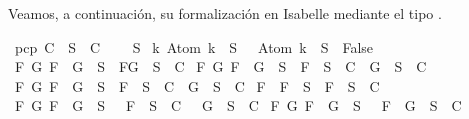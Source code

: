 \begin{isabellebody}
\begin{isamarkuptext}
  Veamos, a continuación, su formalización en Isabelle mediante el tipo .%
\end{isamarkuptext}\isamarkuptrue%
\isamarkupfalse%
\ {\isachardoublequoteopen}pcp\ C\ {\isasymequiv}\ {\isacharparenleft}{\isasymforall}S\ {\isasymin}\ C{\isachardot}\isanewline
\ \ {\isasymbottom}\ {\isasymnotin}\ S\isanewline
{\isasymand}\ {\isacharparenleft}{\isasymforall}k{\isachardot}\ Atom\ k\ {\isasymin}\ S\ {\isasymlongrightarrow}\ \isactrlbold {\isasymnot}\ {\isacharparenleft}Atom\ k{\isacharparenright}\ {\isasymin}\ S\ {\isasymlongrightarrow}\ False{\isacharparenright}\isanewline
{\isasymand}\ {\isacharparenleft}{\isasymforall}F\ G{\isachardot}\ F\ \isactrlbold {\isasymand}\ G\ {\isasymin}\ S\ {\isasymlongrightarrow}\ {\isacharbraceleft}F{\isacharcomma}G{\isacharbraceright}\ {\isasymunion}\ S\ {\isasymin}\ C{\isacharparenright}\isanewline
{\isasymand}\ {\isacharparenleft}{\isasymforall}F\ G{\isachardot}\ F\ \isactrlbold {\isasymor}\ G\ {\isasymin}\ S\ {\isasymlongrightarrow}\ {\isacharbraceleft}F{\isacharbraceright}\ {\isasymunion}\ S\ {\isasymin}\ C\ {\isasymor}\ {\isacharbraceleft}G{\isacharbraceright}\ {\isasymunion}\ S\ {\isasymin}\ C{\isacharparenright}\isanewline
{\isasymand}\ {\isacharparenleft}{\isasymforall}F\ G{\isachardot}\ F\ \isactrlbold {\isasymrightarrow}\ G\ {\isasymin}\ S\ {\isasymlongrightarrow}\ {\isacharbraceleft}\isactrlbold {\isasymnot}F{\isacharbraceright}\ {\isasymunion}\ S\ {\isasymin}\ C\ {\isasymor}\ {\isacharbraceleft}G{\isacharbraceright}\ {\isasymunion}\ S\ {\isasymin}\ C{\isacharparenright}\isanewline
{\isasymand}\ {\isacharparenleft}{\isasymforall}F{\isachardot}\ \isactrlbold {\isasymnot}\ {\isacharparenleft}\isactrlbold {\isasymnot}F{\isacharparenright}\ {\isasymin}\ S\ {\isasymlongrightarrow}\ {\isacharbraceleft}F{\isacharbraceright}\ {\isasymunion}\ S\ {\isasymin}\ C{\isacharparenright}\isanewline
{\isasymand}\ {\isacharparenleft}{\isasymforall}F\ G{\isachardot}\ \isactrlbold {\isasymnot}{\isacharparenleft}F\ \isactrlbold {\isasymand}\ G{\isacharparenright}\ {\isasymin}\ S\ {\isasymlongrightarrow}\ {\isacharbraceleft}\isactrlbold {\isasymnot}\ F{\isacharbraceright}\ {\isasymunion}\ S\ {\isasymin}\ C\ {\isasymor}\ {\isacharbraceleft}\isactrlbold {\isasymnot}\ G{\isacharbraceright}\ {\isasymunion}\ S\ {\isasymin}\ C{\isacharparenright}\isanewline
{\isasymand}\ {\isacharparenleft}{\isasymforall}F\ G{\isachardot}\ \isactrlbold {\isasymnot}{\isacharparenleft}F\ \isactrlbold {\isasymor}\ G{\isacharparenright}\ {\isasymin}\ S\ {\isasymlongrightarrow}\ {\isacharbraceleft}\isactrlbold {\isasymnot}\ F{\isacharcomma}\ \isactrlbold {\isasymnot}\ G{\isacharbraceright}\ {\isasymunion}\ S\ {\isasymin}\ C{\isacharparenright}\isanewline

\end{isabellebody}
